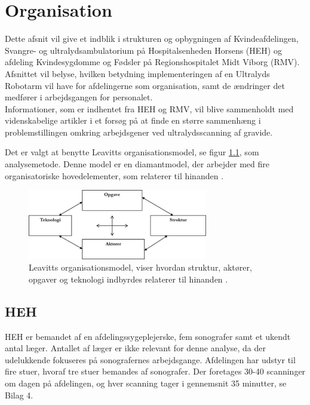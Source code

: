 \chapter{Organisation} \label{Organisation}
Dette afsnit vil give et indblik i strukturen og opbygningen af Kvindeafdelingen, Svangre- og ultralydsambulatorium på Hospitalsenheden Horsens (HEH) og afdeling Kvindesygdomme og Fødsler på Regionshospitalet Midt Viborg (RMV). Afsnittet vil belyse, hvilken betydning implementeringen af en Ultralyds Robotarm vil have for afdelingerne som organisation, samt de ændringer det medfører i arbejdsgangen for personalet. \\
Informationer, som er indhentet fra HEH og RMV, vil blive sammenholdt med videnskabelige artikler i et forsøg på at finde en større sammenhæng i problemstillingen omkring arbejdsgener ved ultralydsscanning af gravide. 

Det er valgt at benytte Leavitts organisationsmodel, se figur \ref{DiamantModel}, som analysemetode. Denne model er en diamantmodel, der arbejder med fire organisatoriske hovedelementer, som relaterer til hinanden \cite{Leavitt} \cite{diamantmodel}. 

\begin{figure}[h!]\centering
	\includegraphics[width = 0.7\textwidth]{Figurer/LeavittModel}
	\caption{Leavitts organisationsmodel, viser hvordan struktur, aktører, opgaver og teknologi indbyrdes relaterer til hinanden \cite{diamantmodel}.}
	\label{DiamantModel}
\end{figure}

\section{HEH}
HEH er bemandet af en afdelingssygeplejerske, fem sonografer samt et ukendt antal læger. Antallet af læger er ikke relevant for denne analyse, da der udelukkende fokuseres på sonografernes arbejdsgange.
Afdelingen har udstyr til fire stuer, hvoraf tre stuer bemandes af sonografer. Der foretages 30-40 scanninger om dagen på afdelingen, og hver scanning tager i gennemsnit 35 minutter, se Bilag 4. 

